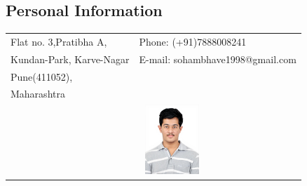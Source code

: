 \documentclass[margin,line]{res}
\begin{document}

\begin{resume}
\section{\sc Personal Information}


\begin{tabular}{@{}p{3.5in}p{3in}}
Flat no. 3,Pratibha A,              & {Phone:}  (+91)7888008241 \\
Kundan-Park, Karve-Nagar
 & {E-mail:} sohambhave1998@gmail.com\\
Pune(411052), \\
Maharashtra   \\
& \centering\includegraphics[width=2.5cm, height=2.6cm]{SohamBhave.jpg} \\
\end{tabular}


\end{resume}
\end{document}
